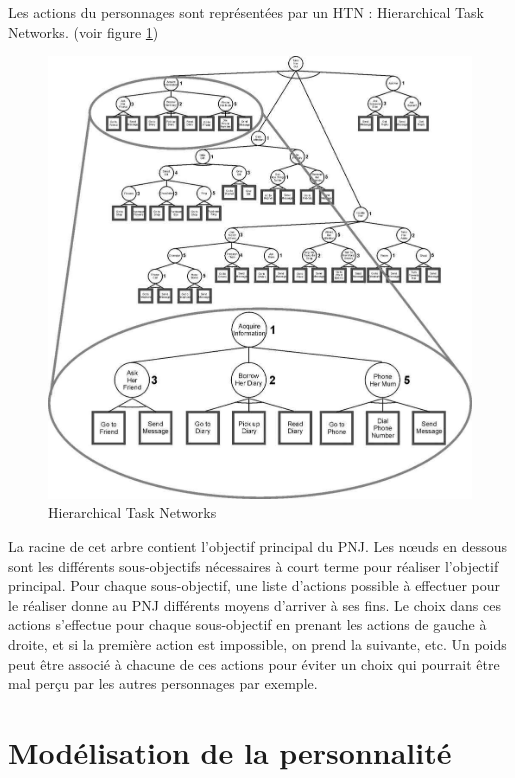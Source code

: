 \documentclass[asi]{picINSA}
\begin{document}
Les actions du personnages sont représentées par un HTN : Hierarchical Task Networks. (voir figure \ref{fig:htn})\\
\begin{figure}[h!]
  \centering
  \includegraphics[scale=0.4]{images/htn.png}
  \caption{Hierarchical Task Networks}
  \label{fig:htn}
\end{figure}

La racine de cet arbre contient l'objectif principal du PNJ. Les nœuds en dessous sont les différents sous-objectifs nécessaires à court terme pour réaliser l'objectif principal. Pour chaque sous-objectif, une liste d'actions possible à effectuer pour le réaliser donne au PNJ différents moyens d'arriver à ses fins. Le choix dans ces actions s'effectue pour chaque sous-objectif en prenant les actions de gauche à droite, et si la première action est impossible, on prend la suivante, etc. Un poids peut être associé à chacune de ces actions pour éviter un choix qui pourrait être mal perçu par les autres personnages par exemple.\\


\section{Modélisation de la personnalité}
\end{document}
